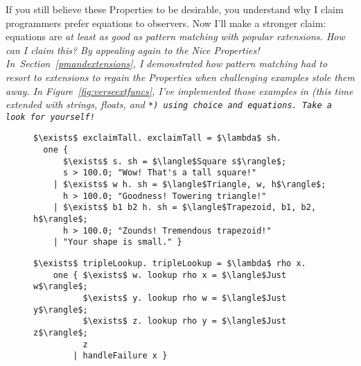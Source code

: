 \documentclass[manuscript,screen,review, 12pt, nonacm]{acmart}
\begin{document}
    If you still believe these Properties to be desirable, you understand why I
    claim programmers prefer equations to observers. Now I'll make a stronger
    claim: equations are \it{at least as good as} pattern matching with popular
    extensions. How can I claim this? By appealing again to the Nice Properties!
    In~Section~\ref{pmandextensions}, I demonstrated how pattern matching had to
    resort to extensions to regain the Properties when challenging examples
    stole them away. In Figure~\ref{fig:verseextfuncs}, I've implemented those
    examples in \VC (this time extended with strings, floats, and \tt{*}) using
    choice and equations. Take a look for yourself! 

    \begin{figure}[ht] 
        \begin{minipage}[h]{0.54\linewidth}
          \verselst
          \begin{lstlisting}[numbers=none, basicstyle=\tiny, xleftmargin=.2em,
                            showstringspaces=false,
                            frame=single]
$\exists$ exclaimTall. exclaimTall = $\lambda$ sh. 
  one { 
      $\exists$ s. sh = $\langle$Square s$\rangle$; 
      s > 100.0; "Wow! That's a tall square!"
    | $\exists$ w h. sh = $\langle$Triangle, w, h$\rangle$; 
      h > 100.0; "Goodness! Towering triangle!"
    | $\exists$ b1 b2 h. sh = $\langle$Trapezoid, b1, b2, h$\rangle$;
      h > 100.0; "Zounds! Tremendous trapezoid!"
    | "Your shape is small." }
            \end{lstlisting}
            \label{fig:verseexclaimtall} 
        \end{minipage}%
        \begin{minipage}[h]{0.5\linewidth}
          \verselst
          \begin{lstlisting}[numbers=none, basicstyle=\tiny, xleftmargin=2em,
                        frame=single]
$\exists$ tripleLookup. tripleLookup = $\lambda$ rho x. 
    one { $\exists$ w. lookup rho x = $\langle$Just w$\rangle$; 
          $\exists$ y. lookup rho w = $\langle$Just y$\rangle$; 
          $\exists$ z. lookup rho y = $\langle$Just z$\rangle$;
          z
        | handleFailure x }
          \end{lstlisting}
            \label{fig:versetriplelookup} 

\end{minipage}
\end{figure}
\end{document}
